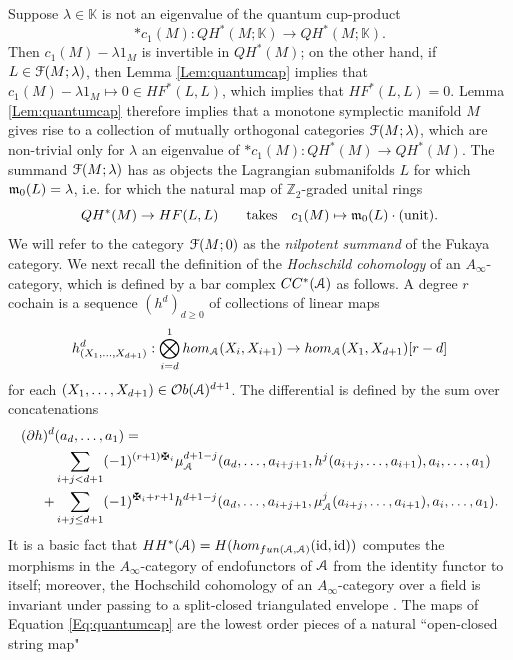 \documentclass[reqno,10pt]{amsart}
\numberwithin{equation}{section}
\newcommand{\bK}{{\mathbb K}}
\newcommand{\bZ}{{\mathbb Z}}
\newcommand{\scrF}{\EuScript{F}}
\newcommand{\scrA}{\EuScript{A}}
\newcommand{\id}{\operatorname{id}}
\newcommand{\Ob}{{\mathcal Ob}}
\theoremstyle{remark}
\begin{document}
Suppose $\lambda \in \bK$ is not an eigenvalue of the quantum cup-product
\[
\ast c_1(M): QH^*(M;\bK) \rightarrow QH^*(M;\bK).
\]
Then $c_1(M) - \lambda 1_M$ is invertible in $QH^*(M)$; on the other hand, if $L \in \scrF(M;\lambda)$, then Lemma \ref{Lem:quantumcap} implies that $c_1(M) - \lambda 1_M \mapsto 0 \in HF^*(L,L)$, which implies that $HF^*(L,L) = 0$.  
Lemma \ref{Lem:quantumcap} therefore implies that a monotone symplectic manifold $M$ gives rise to a collection of mutually orthogonal categories $\scrF(M;\lambda)$,  which are non-trivial only for $\lambda$ an eigenvalue of $\ast c_1(M): QH^*(M) \rightarrow QH^*(M)$.  The summand $\scrF(M;\lambda)$ has as objects the Lagrangian submanifolds $L$ for which $\frak{m}_0(L) = \lambda$, i.e. for which  the natural map of $\bZ_2$-graded unital rings
\begin{equation} \label{Eq:quantumcap}
QH^*(M) \rightarrow HF(L,L) \qquad \textrm{takes} \quad c_1(M) \mapsto \frak{m}_0(L)\cdot (\textrm{unit}).
\end{equation}
We will refer to the category $\scrF(M;0)$ as the \emph{nilpotent summand} of the Fukaya category.  We next recall the definition of the \emph{Hochschild cohomology} of an $A_{\infty}$-category, which is defined by a bar complex  $CC^*(\scrA)$ as follows.  A degree $r$ cochain is a sequence $(h^d)_{d\geq 0}$ of collections of linear maps
\[
h^d_{(X_1,\ldots,X_{d+1})}: \bigotimes_{i=d}^1 hom_{\scrA}(X_i,X_{i+1}) \rightarrow hom_{\scrA}(X_1,X_{d+1})[r-d]
\]
for each $(X_1,\ldots,X_{d+1})\in \Ob(\scrA)^{d+1}$.   The differential is defined by the sum over  concatenations
\begin{equation} \label{Eqn:Hochschild}
\begin{aligned}
(\partial h)^d & (a_d,\ldots, a_1) = \\
& \sum_{i+j<d+1} (-1)^{(r+1)\maltese_i} \mu_{\scrA}^{d+1-j}(a_d,\ldots,a_{i+j+1},h^j(a_{i+j},\ldots,a_{i+1}),a_{i},\ldots,a_1) \\
+ &  \sum_{i+j\leq d+1} (-1)^{\maltese_{i} +r +1}  h^{d+1-j} (a_d,\ldots,a_{i+j+1},\mu_{\scrA}^j(a_{i+j},\ldots,a_{i+1}),a_{i},\ldots,a_1).
\end{aligned}
\end{equation}
It is a basic fact that  $HH^*(\scrA) = H(hom_{fun(\scrA,\scrA)}(\id,\id))$ computes the morphisms in the $A_{\infty}$-category of endofunctors of $\scrA$ from the identity functor to itself; moreover, the Hochschild cohomology of an $A_{\infty}$-category over a field is invariant under passing to a split-closed triangulated envelope \cite[Theorem 4.12]{BM}. The maps of Equation \ref{Eq:quantumcap} are the lowest order pieces of a natural ``open-closed string map" 
\end{document}
